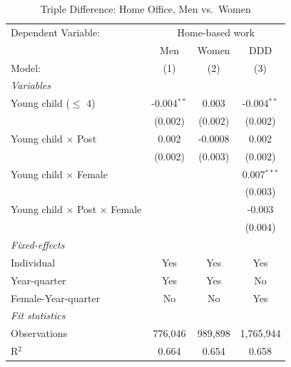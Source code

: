 
\begin{table}[H]
   \caption{\label{tab:triple_diff} Triple Difference: Home Office, Men vs.\ Women}
   \centering
\small\setlength{\tabcolsep}{5pt}
   \begin{tabular}{lccc}
      \toprule
      Dependent Variable: & \multicolumn{3}{c}{Home-based work}\\
                                                  & Men           & Women   & DDD \\   
      Model:                                      & (1)           & (2)     & (3)\\  
      \midrule
      \emph{Variables}\\
      Young child ($\leq$ 4)                      & -0.004$^{**}$ & 0.003   & -0.004$^{**}$\\   
                                                  & (0.002)       & (0.002) & (0.002)\\   
\addlinespace[2pt]
      Young child $\times$ Post                   & 0.002         & -0.0008 & 0.002\\   
                                                  & (0.002)       & (0.003) & (0.002)\\   
\addlinespace[2pt]
      Young child $\times$ Female                 &               &         & 0.007$^{***}$\\   
                                                  &               &         & (0.003)\\   
\addlinespace[2pt]
      Young child $\times$ Post $\times$ Female   &               &         & -0.003\\   
                                                  &               &         & (0.004)\\   
\addlinespace[2pt]
      \midrule
      \emph{Fixed-effects}\\
      Individual                                  & Yes           & Yes     & Yes\\  
      Year-quarter & Yes & Yes & No\\
      Female-Year-quarter & No & No & Yes\\
      \midrule
      \emph{Fit statistics}\\
      Observations                                & 776,046       & 989,898 & 1,765,944\\  
      R$^2$                                       & 0.664         & 0.654   & 0.658\\  
\bottomrule
   \end{tabular}
   

\end{table}
